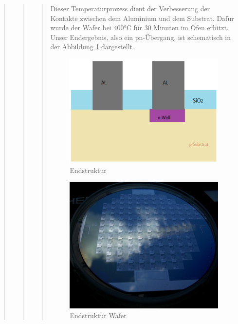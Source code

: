 \begin{quote}
\begin{quote}
\begin{quote}
			Dieser Temperaturprozess dient der Verbesserung der Kontakte  
			zwischen dem Aluminium und dem Substrat. Dafür wurde der Wafer bei 
			400°C für 30 Minuten im Ofen erhitzt.\\

			Unser Endergebnis, also ein pn-Übergang, ist schematisch  in der 
			Abbildung \ref{fig:end} dargestellt. 
    		
    		\vspace{2em}

    		\begin{figure}[H]
				\hspace{3 cm}
                  \includegraphics[scale=1, trim = 0cm 0cm 0cm 0cm,clip]
                	{./HerstellungBilder/Endstruktur.png}
                  \caption{Endstruktur}
                \label{fig:end}
            \end{figure}
            
    		\vspace{2em}
    		

    		\begin{figure}[H]
				\hspace{3 cm}
                  \includegraphics[scale=1, trim = 0cm 0cm 0cm 0cm,clip]
                	{./HerstellungBilder/EndergebnisWafer120502.png}
                  \caption{Endstruktur Wafer}
                \label{fig:endwaf}
            \end{figure}
            

\end{quote}
\end{quote}
\end{quote}
